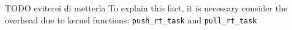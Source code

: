 \begin{description}
\end{description}

TODO eviterei di metterla
 To explain this fact, it is necessary consider the overhead due to kernel 
functions: \texttt{push\_rt\_task} and \texttt{pull\_rt\_task}

